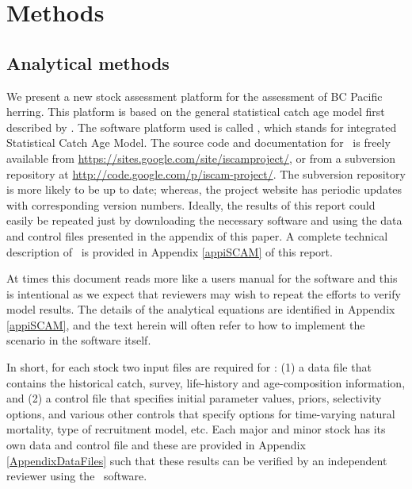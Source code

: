 \section{Methods}


	\subsection{Analytical methods}
	We present a new stock assessment platform for the assessment of BC Pacific herring. This platform is based on the general statistical catch age model first described by \cite{fournier1982general}.  The software platform used is called \iscam, which stands for integrated Statistical Catch Age Model.  The source code and documentation for \iscam\ is freely available from \url{https://sites.google.com/site/iscamproject/}, or from a subversion repository at \url{http://code.google.com/p/iscam-project/}.  The subversion repository is more likely to be up to date; whereas, the project website has periodic updates with corresponding version numbers.  Ideally, the results of this report could easily be repeated just by downloading the necessary software and using the data and control files presented in the appendix of this paper. A complete technical description of \iscam\ is provided in Appendix \ref{appiSCAM} of this report.
	
	At times this document reads more like a users manual for the \iscam software and this is intentional as we expect that reviewers may wish to repeat the efforts to verify model results.  The details of the analytical equations are identified in Appendix \ref{appiSCAM}, and the text herein will often refer to how to implement the scenario in the software itself.
	
	
	In short, for each stock  two input files are required for \iscam: (1) a data file that contains the historical catch, survey, life-history and age-composition information, and (2) a control file that specifies initial parameter values, priors, selectivity options, and various other controls that specify options for time-varying natural mortality, type of recruitment model, etc.  Each major and minor stock has its own data and control file and these are provided in Appendix \ref{AppendixDataFiles} such that these results can be verified by an independent reviewer using the \iscam\ software.
	
